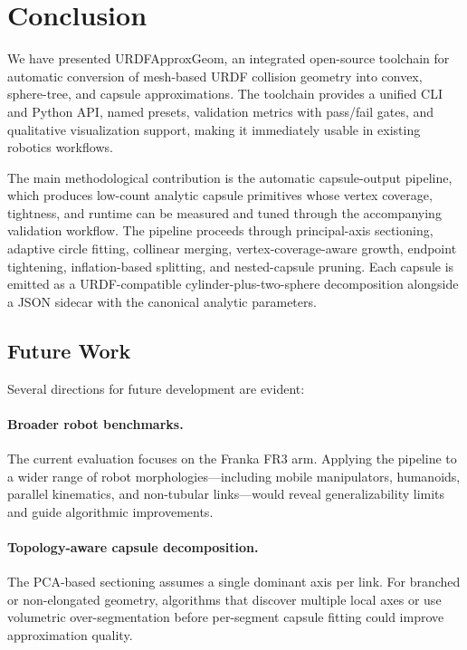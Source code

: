 \section{Conclusion}
\label{sec:conclusion}

We have presented URDFApproxGeom, an integrated open-source toolchain for automatic conversion of mesh-based URDF collision geometry into convex, sphere-tree, and capsule approximations.
The toolchain provides a unified CLI and Python API, named presets, validation metrics with pass/fail gates, and qualitative visualization support, making it immediately usable in existing robotics workflows.

The main methodological contribution is the automatic capsule-output pipeline, which produces low-count analytic capsule primitives whose vertex coverage, tightness, and runtime can be measured and tuned through the accompanying validation workflow. The pipeline proceeds through principal-axis sectioning, adaptive circle fitting, collinear merging, vertex-coverage-aware growth, endpoint tightening, inflation-based splitting, and nested-capsule pruning.
Each capsule is emitted as a URDF-compatible cylinder-plus-two-sphere decomposition alongside a JSON sidecar with the canonical analytic parameters.

\subsection*{Future Work}

Several directions for future development are evident:

\paragraph{Broader robot benchmarks.}
The current evaluation focuses on the Franka FR3 arm.
Applying the pipeline to a wider range of robot morphologies---including mobile manipulators, humanoids, parallel kinematics, and non-tubular links---would reveal generalizability limits and guide algorithmic improvements.

\paragraph{Topology-aware capsule decomposition.}
The PCA-based sectioning assumes a single dominant axis per link.
For branched or non-elongated geometry, algorithms that discover multiple local axes or use volumetric over-segmentation before per-segment capsule fitting could improve approximation quality.

